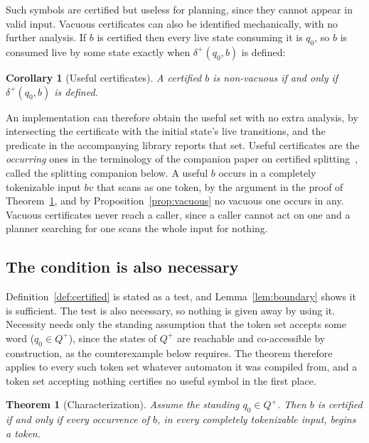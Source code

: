 \documentclass[11pt,a4paper]{article}
\theoremstyle{definition}
\theoremstyle{plain}
\newtheorem{theorem}{Theorem}
\newtheorem{corollary}{Corollary}
\begin{document}
Such symbols are certified but useless for planning, since they cannot appear in valid input. Vacuous certificates can
also be identified mechanically, with no further analysis. If $b$ is certified then every live state consuming it is
$q_0$, so $b$ is consumed live by some state exactly when $\delta^+(q_0, b)$ is defined:

\begin{corollary}[Useful certificates]
\label{cor:useful}
A certified $b$ is non-vacuous if and only if $\delta^+(q_0, b)$ is defined.
\end{corollary}

An implementation can therefore obtain the useful set with no extra analysis, by intersecting the certificate with the
initial state's live transitions, and the predicate in the accompanying library reports that set. Useful certificates
are the \emph{occurring} ones in the terminology of the companion paper on certified
splitting~\cite{nidhogg2026certifiedsplitting}, called the splitting companion below. A useful $b$ occurs in a
completely tokenizable input $bv$ that scans as one token, by the argument in the proof of Theorem~\ref{thm:necessity},
and by Proposition~\ref{prop:vacuous} no vacuous one occurs in any. Vacuous certificates never reach a caller, since a
caller cannot act on one and a planner searching for one scans the whole input for nothing.

\subsection{The condition is also necessary}
\label{sec:necessity}

Definition~\ref{def:certified} is stated as a test, and Lemma~\ref{lem:boundary} shows it is sufficient. The test is
also necessary, so nothing is given away by using it. Necessity needs only the standing assumption that the token set
accepts some word ($q_0 \in Q^+$), since the states of $Q^+$ are reachable and co-accessible by construction, as the
counterexample below requires. The theorem therefore applies to every such token set whatever automaton it was compiled
from, and a token set accepting nothing certifies no useful symbol in the first place.

\begin{theorem}[Characterization]
\label{thm:necessity}
Assume the standing $q_0 \in Q^+$. Then $b$ is certified if and only if every occurrence of $b$, in every completely
tokenizable input, begins a token.
\end{theorem}
\end{document}
